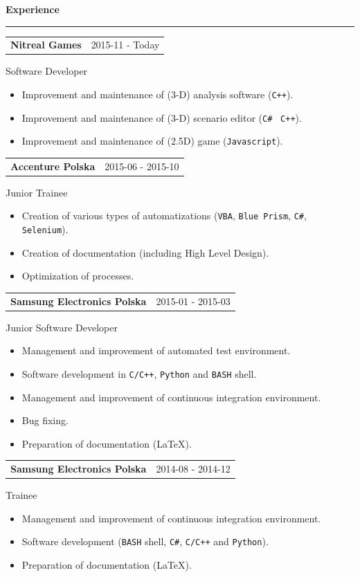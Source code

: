 \documentclass{article}
\newcommand{\header}[1] 
{
	\textbf{\large #1}
	\vspace{0.005\textheight}
	\hrule 
	\vspace{0.005\textheight}
}
\begin{document}
\header{Experience}

\begin{tabular}{@{} m{} R{0.37\textwidth} }
\textbf{Nitreal Games}	& {2015-11 - Today} 
\end{tabular}
Software Developer\\
\begin{itemize}
	\item Improvement and maintenance of (3-D) analysis software (\texttt{C++}).
	\item Improvement and maintenance of (3-D) scenario editor (\texttt{C\#} \ \texttt{C++}).
	\item Improvement and maintenance of (2.5D) game (\texttt{Javascript}).
\end{itemize}

\begin{tabular}{@{} m{} R{0.37\textwidth} }
\textbf{Accenture Polska}	& {2015-06 - 2015-10} 
\end{tabular}
Junior Trainee\\
\begin{itemize}
	\item Creation of various types of automatizations (\texttt{VBA}, \texttt{Blue Prism}, \texttt{C\#}, \texttt{Selenium}).
	\item Creation of documentation (including High Level Design).
	\item Optimization of processes. 
\end{itemize}

\begin{tabular}{@{} m{} R{0.37\textwidth} }
\textbf{Samsung Electronics Polska}	& {2015-01 - 2015-03} 
\end{tabular}
Junior Software Developer\\
\begin{itemize}
	\item Management and improvement of automated test environment.
	\item Software development in \texttt{C/C++}, \texttt{Python} and \texttt{BASH} shell.
	\item Management and improvement of continuous integration environment.
	\item Bug fixing.
	\item Preparation of documentation (\LaTeX).
\end{itemize}

\begin{tabular}{@{} m{} R{0.37\textwidth} }
	\textbf{Samsung Electronics Polska}	& {2014-08 - 2014-12} 
\end{tabular}
Trainee\\
\begin{itemize}
	\item Management and improvement of continuous integration environment.
	\item Software development (\texttt{BASH} shell, \texttt{C\#}, \texttt{C/C++} and \texttt{Python}).
	\item Preparation of documentation (\LaTeX). 
\end{itemize}
\end{document}
